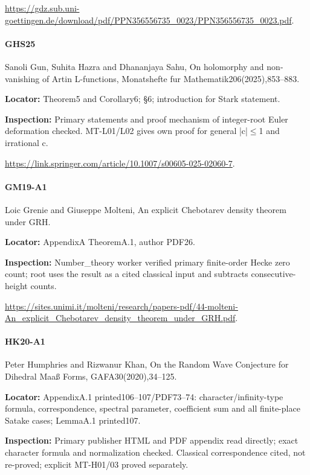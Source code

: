 \documentclass[11pt,a4paper]{article}
\begin{document}
\url{https://gdz.sub.uni-goettingen.de/download/pdf/PPN356556735_0023/PPN356556735_0023.pdf}.

\paragraph{GHS25} Sanoli Gun, Suhita Hazra and Dhananjaya Sahu, On holomorphy and non-vanishing of Artin L-functions, Monatshefte fur Mathematik206(2025),853–\allowbreak{}883.

\textbf{Locator:} Theorem5 and Corollary6; §6; introduction for Stark statement.

\textbf{Inspection:} Primary statements and proof mechanism of integer-root Euler deformation checked.\allowbreak{} MT-L01/\allowbreak{}L02 gives own proof for general |c|\ensuremath{\le}1 and irrational c.\allowbreak{}

\url{https://link.springer.com/article/10.1007/s00605-025-02060-7}.

\paragraph{GM19-A1} Loic Grenie and Giuseppe Molteni, An explicit Chebotarev density theorem under GRH.

\textbf{Locator:} AppendixA TheoremA.\allowbreak{}1, author PDF26.

\textbf{Inspection:} Number\_\allowbreak{}theory worker verified primary finite-order Hecke zero count; root uses the result as a cited classical input and subtracts consecutive-height counts.\allowbreak{}

\url{https://sites.unimi.it/molteni/research/papers-pdf/44-molteni-An_explicit_Chebotarev_density_theorem_under_GRH.pdf}.

\paragraph{HK20-A1} Peter Humphries and Rizwanur Khan, On the Random Wave Conjecture for Dihedral Maaß Forms, GAFA30(2020),34–\allowbreak{}125.

\textbf{Locator:} AppendixA.\allowbreak{}1 printed106–\allowbreak{}107/\allowbreak{}PDF73–\allowbreak{}74:\allowbreak{} character/\allowbreak{}infinity-type formula, correspondence, spectral parameter, coefficient sum and all finite-place Satake cases; LemmaA.\allowbreak{}1 printed107.

\textbf{Inspection:} Primary publisher HTML and PDF appendix read directly; exact character formula and normalization checked.\allowbreak{} Classical correspondence cited, not re-proved; explicit MT-H01/\allowbreak{}03 proved separately.\allowbreak{}
\end{document}
